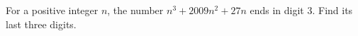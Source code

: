 For a positive integer $n$, the number $n^3+2009n^2+27n$ ends in digit $3$. Find its last three digits.
